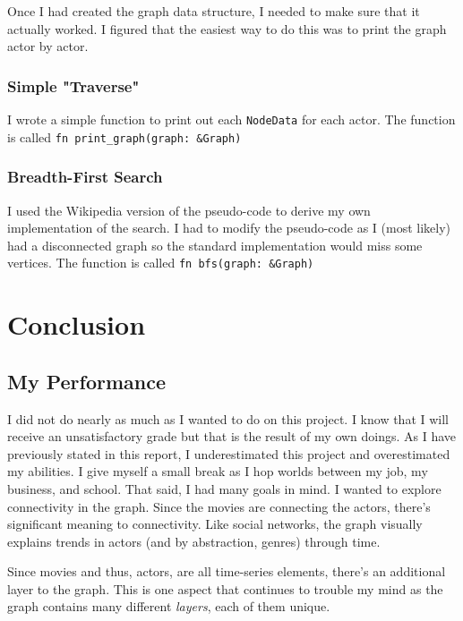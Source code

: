 \documentclass[12pt,letterpaper]{article}
\begin{document}
Once I had created the graph data structure, I needed to make sure that it actually worked.  I figured that the easiest way to do this was to print the graph actor by actor. 

\subsubsection{Simple "Traverse"}

I wrote a simple function to print out each \texttt{NodeData} for each actor.  The function is called \texttt{fn print\_graph(graph: \&Graph)}

\subsubsection{Breadth-First Search}

I used the Wikipedia version of the pseudo-code to derive my own implementation of the search. I had to modify the pseudo-code as I (most likely) had a disconnected graph so the standard implementation would miss some vertices.  The function is called \texttt{fn bfs(graph: \&Graph)}

\section{Conclusion}

\subsection{My Performance}

I did not do nearly as much as I wanted to do on this project.  I know that I will receive an unsatisfactory grade but that is the result of my own doings.  As I have previously stated in this report,  I underestimated this project and overestimated my abilities.  I give myself a small break as I hop worlds between my job, my business, and school.  That said, I had many goals in mind. I wanted to explore connectivity in the graph. Since the movies are connecting the actors, there's significant meaning to connectivity. Like social networks,  the graph visually explains trends in actors (and by abstraction, genres) through time. 

Since movies and thus, actors, are all time-series elements, there's an additional layer to the graph.  This is one aspect that continues to trouble my mind as the graph contains many different \textit{layers}, each of them unique.  
\end{document}
